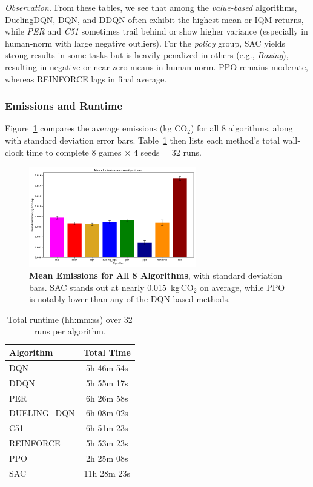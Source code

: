 \noindent
\emph{Observation.} From these tables, we see that among the \emph{value-based} algorithms, 
DuelingDQN, DQN, and DDQN often exhibit the highest mean or IQM returns, while 
\emph{PER} and \emph{C51} sometimes trail behind or show higher variance (especially in 
human‐norm with large negative outliers). For the \emph{policy} group, SAC yields strong 
results in some tasks but is heavily penalized in others (e.g., \emph{Boxing}), resulting 
in negative or near‐zero means in human norm. PPO remains moderate, whereas REINFORCE 
lags in final average.

\subsubsection{Emissions and Runtime}

Figure~\ref{fig:barplot_emissions_total} compares the average emissions (kg CO$_2$) for 
all 8 algorithms, along with standard deviation error bars. Table~\ref{tab:total_runtimes} 
then lists each method’s total wall‐clock time to complete 8 games × 4 seeds = 32 runs.

\begin{figure}[htbp]
	\centering
	\includegraphics[width=0.65\textwidth]{figures/comparison/barplot_emissions_total.png}
	\caption{\textbf{Mean Emissions for All 8 Algorithms}, with standard deviation bars.
		SAC stands out at nearly 0.015~kg\,CO$_2$ on average, while PPO is notably lower than
		any of the DQN-based methods.}
	\label{fig:barplot_emissions_total}
\end{figure}

\begin{table}[htbp]
	\centering
	\caption{Total runtime (hh:mm:ss) over 32 runs per algorithm.}
	\label{tab:total_runtimes}
	\begin{tabular}{lc}
		\toprule
		\textbf{Algorithm} & \textbf{Total Time} \\
		\midrule
		DQN          & 5h 46m 54s \\
		DDQN         & 5h 55m 17s \\
		PER          & 6h 26m 58s \\
		DUELING\_DQN & 6h 08m 02s \\
		C51          & 6h 51m 23s \\
		REINFORCE    & 5h 53m 23s \\
		PPO          & 2h 25m 08s \\
		SAC          & 11h 28m 23s \\
		\bottomrule
	\end{tabular}
\end{table}

